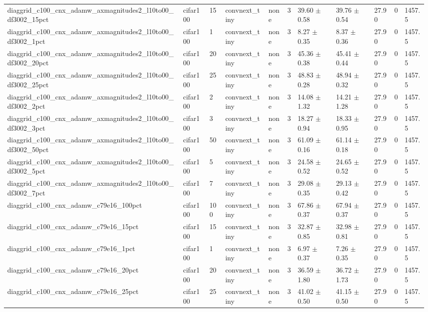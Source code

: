 \begin{tabular}{lllllllllll}
diaggrid_c100_cnx_adamw_axmagnitudes2_l10to00_df3002_15pct & cifar100 & 15 & convnext_tiny & none & 3 & 39.60 $\pm$ 0.58 & 39.76 $\pm$ 0.54 & 27.90 & 0 & 1457.5 \\
diaggrid_c100_cnx_adamw_axmagnitudes2_l10to00_df3002_1pct & cifar100 & 1 & convnext_tiny & none & 3 & 8.27 $\pm$ 0.35 & 8.37 $\pm$ 0.36 & 27.90 & 0 & 1457.5 \\
diaggrid_c100_cnx_adamw_axmagnitudes2_l10to00_df3002_20pct & cifar100 & 20 & convnext_tiny & none & 3 & 45.36 $\pm$ 0.38 & 45.41 $\pm$ 0.44 & 27.90 & 0 & 1457.5 \\
diaggrid_c100_cnx_adamw_axmagnitudes2_l10to00_df3002_25pct & cifar100 & 25 & convnext_tiny & none & 3 & 48.83 $\pm$ 0.28 & 48.94 $\pm$ 0.32 & 27.90 & 0 & 1457.5 \\
diaggrid_c100_cnx_adamw_axmagnitudes2_l10to00_df3002_2pct & cifar100 & 2 & convnext_tiny & none & 3 & 14.08 $\pm$ 1.32 & 14.21 $\pm$ 1.28 & 27.90 & 0 & 1457.5 \\
diaggrid_c100_cnx_adamw_axmagnitudes2_l10to00_df3002_3pct & cifar100 & 3 & convnext_tiny & none & 3 & 18.27 $\pm$ 0.94 & 18.33 $\pm$ 0.95 & 27.90 & 0 & 1457.5 \\
diaggrid_c100_cnx_adamw_axmagnitudes2_l10to00_df3002_50pct & cifar100 & 50 & convnext_tiny & none & 3 & 61.09 $\pm$ 0.16 & 61.14 $\pm$ 0.18 & 27.90 & 0 & 1457.5 \\
diaggrid_c100_cnx_adamw_axmagnitudes2_l10to00_df3002_5pct & cifar100 & 5 & convnext_tiny & none & 3 & 24.58 $\pm$ 0.52 & 24.65 $\pm$ 0.52 & 27.90 & 0 & 1457.5 \\
diaggrid_c100_cnx_adamw_axmagnitudes2_l10to00_df3002_7pct & cifar100 & 7 & convnext_tiny & none & 3 & 29.08 $\pm$ 0.35 & 29.13 $\pm$ 0.42 & 27.90 & 0 & 1457.5 \\
diaggrid_c100_cnx_adamw_c79e16_100pct & cifar100 & 100 & convnext_tiny & none & 3 & 67.86 $\pm$ 0.37 & 67.94 $\pm$ 0.37 & 27.90 & 0 & 1457.5 \\
diaggrid_c100_cnx_adamw_c79e16_15pct & cifar100 & 15 & convnext_tiny & none & 3 & 32.87 $\pm$ 0.85 & 32.98 $\pm$ 0.81 & 27.90 & 0 & 1457.5 \\
diaggrid_c100_cnx_adamw_c79e16_1pct & cifar100 & 1 & convnext_tiny & none & 3 & 6.97 $\pm$ 0.37 & 7.26 $\pm$ 0.35 & 27.90 & 0 & 1457.5 \\
diaggrid_c100_cnx_adamw_c79e16_20pct & cifar100 & 20 & convnext_tiny & none & 3 & 36.59 $\pm$ 1.80 & 36.72 $\pm$ 1.73 & 27.90 & 0 & 1457.5 \\
diaggrid_c100_cnx_adamw_c79e16_25pct & cifar100 & 25 & convnext_tiny & none & 3 & 41.02 $\pm$ 0.50 & 41.15 $\pm$ 0.50 & 27.90 & 0 & 1457.5 \\

\end{tabular}
